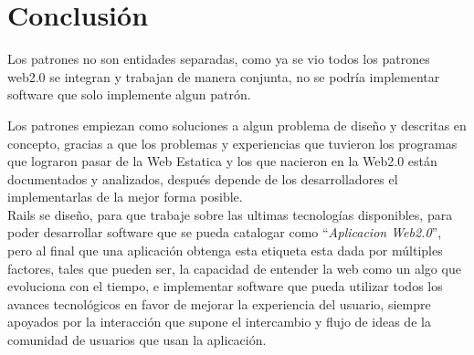   \section{Conclusi\'on} %
  \label{sec:conclusion}
    Los patrones no son entidades separadas, como ya se vio todos los patrones web2.0 
    se integran y trabajan de manera conjunta, no se podría implementar software que solo 
    implemente algun patr\'on.
    
    Los patrones empiezan como soluciones a algun problema de dise\~no y descritas en concepto, 
    gracias a que los problemas y experiencias que tuvieron los programas que lograron pasar de la
    Web Estatica  y los que nacieron en la Web2.0 están documentados y analizados,
    después depende de los desarrolladores el implementarlas de la mejor forma posible.\\

    Rails se dise\~no, para que trabaje sobre las ultimas tecnolog\'ias disponibles, para poder desarrollar 
    software que se pueda catalogar como ``\emph{Aplicacion Web2.0}'', pero al final que una aplicaci\'on
    obtenga esta etiqueta esta dada por m\'ultiples factores, tales que pueden ser,
    la capacidad de entender la web como un algo que evoluciona con el tiempo, e
    implementar software que pueda utilizar todos los avances tecnol\'ogicos en favor
    de mejorar la experiencia del usuario, siempre apoyados por la interacci\'on
    que supone el intercambio y flujo de ideas de la comunidad de usuarios que usan
    la aplicaci\'on.\\  
    
 



